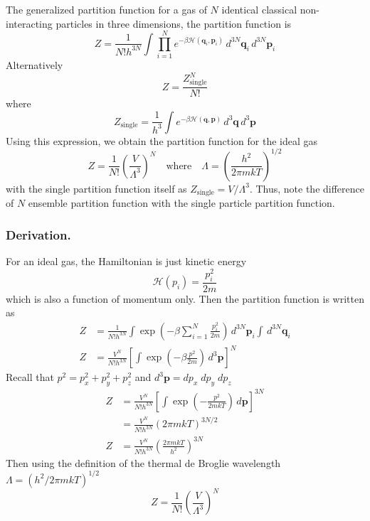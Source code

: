 \documentclass[../../../Main.tex]{subfiles}
\begin{document}
The generalized partition function for a gas of $N$ identical classical non-interacting particles in three dimensions, the partition function is
\begin{equation*}
    Z=\frac{1}{N!h^{3N}} \int \prod_{i=1}^{N} e^{-\beta \mathcal{H}(\mathbf{q}_i, \mathbf{p}_i)} \, d^{3N} \mathbf{q}_i \, d^{3N} \mathbf{p}_i
\end{equation*}
Alternatively
\begin{equation*}
    Z= \frac{Z^N_\text{single}}{N!}
\end{equation*}
where
\begin{equation*}
    Z_\text{single}= \frac{1}{h^{3}} \int e^{-\beta \mathcal{H}(\mathbf{q}, \mathbf{p})} \, d^{3} \mathbf{q} \, d^{3} \mathbf{p}
\end{equation*}
Using this expression, we obtain the partition function for the ideal gas 
\begin{equation*}
    Z=\frac{1}{N!}\left(\frac{V}{\Lambda^3}\right)^N\quad\text{where}\quad \Lambda=\left(\frac{h^2}{2\pi mkT}\right)^{1/2}
\end{equation*}
with the single partition function itself as $Z_\text{single}=V/\Lambda^3$. Thus, note the difference of $N$ ensemble partition function with the single particle partition function.

\subsubsection*{Derivation.} For an ideal gas, the Hamiltonian is just kinetic energy
\begin{equation*}
    \mathcal{H}(p_i)=\frac{p_i^2}{2m}
\end{equation*}
which is also a function of momentum only. Then the partition function is written as 
\begin{align*}
    Z&=\frac{1}{N!h^{3N}} \int \exp\left(-\beta\sum_{i=1}^{N}\frac{p_i^2}{2m}\right) \, d^{3N} \mathbf{p}_i \int\, d^{3N} \mathbf{q}_i\\
    Z&=\frac{V^N}{N!h^{3N}}\left[ \int \exp\left(-\beta\frac{p^2}{2m}\right) \, d^{3} \mathbf{p} \right]^N
\end{align*}
Recall that $p^2=p_x^2 +p_y^2 +p_z^2$ and $d^{3} \mathbf{p}=dp_x\;dp_y\;dp_z$
\begin{align*}
    Z&=\frac{V^N}{N!h^{3N}}\left[ \int \exp\left(-\frac{p^2}{2mkT}\right) \, d\mathbf{p} \right]^{3N}\\
    &=\frac{V^N}{N!h^{3N}}(2\pi mkT )^{3N/2}\\
    Z&=\frac{V^N}{N!h^{3N}}\left(\frac{2\pi mkT}{h^2}\right)^{3N}
\end{align*}
Then using the definition of the thermal de Broglie wavelength $\Lambda= (h^2/2\pi mkT)^{1/2}$
\begin{equation*}
    Z=\frac{1}{N!}\left(\frac{V}{\Lambda^3}\right)^N
\end{equation*}
\end{document}
